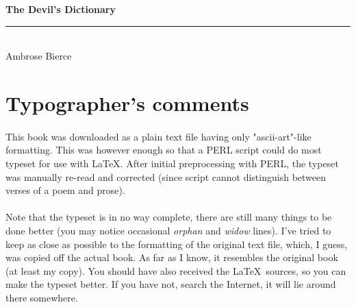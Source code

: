 \documentclass[11pt]{article}
\begin{document}

\begin{titlepage}

\newlength{\centeroffset}
\setlength{\centeroffset}{-0.5\oddsidemargin}
\addtolength{\centeroffset}{0.5\evensidemargin}
\thispagestyle{empty}
\vspace*{3 cm}
\noindent\hspace*{\centeroffset}\begin{minipage}{\textwidth}
\flushright
{\Huge\bfseries The Devil's Dictionary
}
\noindent\rule[-1ex]{\textwidth}{5pt}\\[2.5ex]
\hfill
{\Large Ambrose Bierce}
\end{minipage}


\end{titlepage}

\newpage



\section*{Typographer's comments}

\paragraph{}
This book was downloaded as a plain text file having only "ascii-art"-like
formatting. This was however enough so that a PERL script could do most
typeset for use with \LaTeX.
After initial preprocessing with PERL, the typeset was manually re-read and
corrected (since script cannot distinguish between verses of a poem and
prose).

\paragraph{}
Note that the typeset is in no way complete, there are still many things to
be done better (you may notice occasional {\em orphan} and {\em widow} lines).
I've tried to keep as close as possible to the formatting of the
original text file, which, I guess, was copied off the actual book. As far
as I know, it resembles the original book (at least my copy). You should have
also received the \LaTeX~sources, so you can make the typeset better. If you
have not, search the Internet, it will lie around there somewhere.
\end{document}
